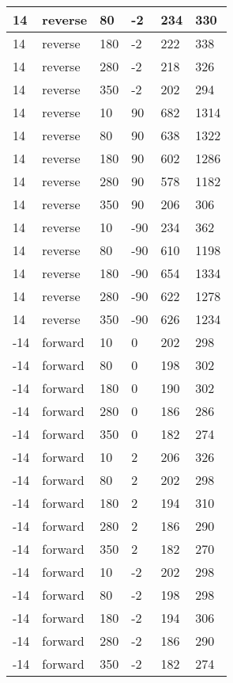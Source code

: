 \begin{table}
\begin{center}
\begin{tabular}{|l|l|l|l|l|l|}
			\hline
			14 & reverse & 80 & -2 & 234 & 330 \\
			\hline
			14 & reverse & 180 & -2 & 222 & 338 \\
			\hline
			14 & reverse & 280 & -2 & 218 & 326 \\
			\hline
			14 & reverse & 350 & -2 & 202 & 294 \\
			\hline
			14 & reverse & 10 & 90 & 682 & 1314 \\
			\hline
			14 & reverse & 80 & 90 & 638 & 1322 \\
			\hline
			14 & reverse & 180 & 90 & 602 & 1286 \\
			\hline
			14 & reverse & 280 & 90 & 578 & 1182 \\
			\hline
			14 & reverse & 350 & 90 & 206 & 306 \\
			\hline
			14 & reverse & 10 & -90 & 234 & 362 \\
			\hline
			14 & reverse & 80 & -90 & 610 & 1198 \\
			\hline
			14 & reverse & 180 & -90 & 654 & 1334 \\
			\hline
			14 & reverse & 280 & -90 & 622 & 1278 \\
			\hline
			14 & reverse & 350 & -90 & 626 & 1234 \\
			\hline
			-14 & forward & 10 & 0 & 202 & 298 \\
			\hline
			-14 & forward & 80 & 0 & 198 & 302 \\
			\hline
			-14 & forward & 180 & 0 & 190 & 302 \\
			\hline
			-14 & forward & 280 & 0 & 186 & 286 \\
			\hline
			-14 & forward & 350 & 0 & 182 & 274 \\
			\hline
			-14 & forward & 10 & 2 & 206 & 326 \\
			\hline
			-14 & forward & 80 & 2 & 202 & 298 \\
			\hline
			-14 & forward & 180 & 2 & 194 & 310 \\
			\hline
			-14 & forward & 280 & 2 & 186 & 290 \\
			\hline
			-14 & forward & 350 & 2 & 182 & 270 \\
			\hline
			-14 & forward & 10 & -2 & 202 & 298 \\
			\hline
			-14 & forward & 80 & -2 & 198 & 298 \\
			\hline
			-14 & forward & 180 & -2 & 194 & 306 \\
			\hline
			-14 & forward & 280 & -2 & 186 & 290 \\
			\hline
			-14 & forward & 350 & -2 & 182 & 274 \\

\end{tabular}
\end{center}
\end{table}
